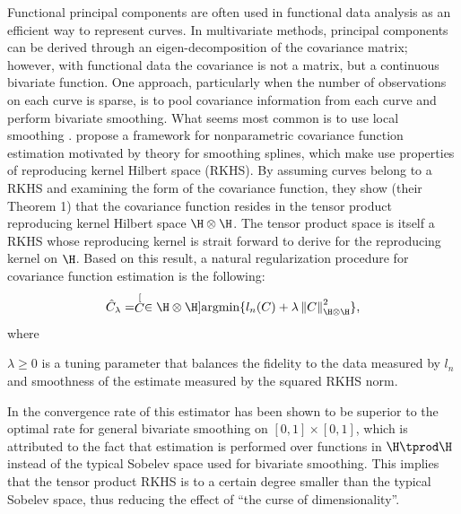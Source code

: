 Functional principal components are often used in functional data analysis as an efficient way to represent curves. In multivariate methods, principal components can be derived through an eigen-decomposition of the covariance matrix; however, with functional data the covariance is not a matrix, but a continuous bivariate function. One approach, particularly when the number of observations on each curve is sparse, is to pool covariance information from each curve and perform bivariate smoothing. What seems most common is to use local smoothing \cite{Yao:2005cv}. \cite{Cai:2010vr} propose a framework for nonparametric covariance function estimation motivated by theory for smoothing splines, which make use properties of reproducing kernel Hilbert space (RKHS). By assuming curves belong to a RKHS and examining the form of the covariance function, they show (their Theorem 1) that the covariance function resides in the tensor product reproducing kernel Hilbert space $\H\otimes \H$. The tensor product space is itself a RKHS whose reproducing kernel is strait forward to derive for the reproducing kernel on $\H$. Based on this result, a natural regularization procedure for covariance function estimation is the following: 
\begin{equation}
	\label{eq:cy-cov-est} \hat{C}_{\lambda} = \stackrel[C \in \H\otimes\H]{}{\mbox{argmin}} \{l_{n}(C)+\lambda\left\Vert C\right\Vert _{\H\otimes \H}^{2}\}, 
\end{equation}
where

$\lambda\geq0$ is a tuning parameter that balances the fidelity to the data measured by $l_{n}$ and smoothness of the estimate measured by the squared RKHS norm.

In \cite{Cai:2010vr} the convergence rate of this estimator has been shown to be superior to the optimal rate for general bivariate smoothing on $[0,1]\times[0,1]$, which is attributed to the fact that estimation is performed over functions in $\H \tprod \H$ instead of the typical Sobelev space used for bivariate smoothing. This implies that the tensor product RKHS is to a certain degree smaller than the typical Sobelev space, thus reducing the effect of ``the curse of dimensionality''.

